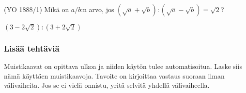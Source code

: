 \begin{tehtavasivu}
\begin{tehtava}
(YO 1888/1) Mikä on $a/b$:n arvo, jos $(\sqrt{a}+\sqrt{b}):(\sqrt{a}-\sqrt{b})=\sqrt{2}$?
	\begin{vastaus}
$(3-2\sqrt{2}):(3+2\sqrt{2})$
	\end{vastaus}
\end{tehtava}

\subsubsection*{Lisää tehtäviä}

\begin{tehtava}
   	Muistikaavat on opittava ulkoa ja niiden käytön tulee automatisoitua. Laske siis nämä käyttäen muistikaavoja. Tavoite on kirjoittaa vastaus suoraan ilman välivaiheita. Jos se ei vielä onnistu, yritä selvitä yhdellä välivaiheella.
    \begin{alakohdat}
    \end{alakohdat}
    \begin{vastaus}
        \begin{alakohdat}
        \end{alakohdat}
    \end{vastaus}
\end{tehtava}


\end{tehtavasivu}
